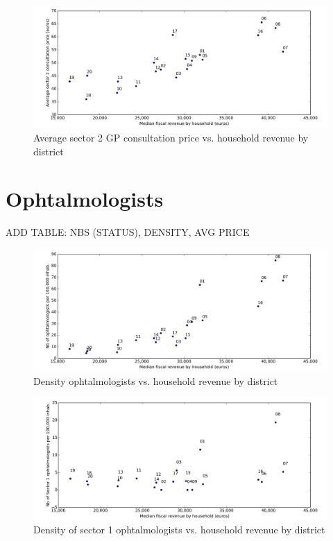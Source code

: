 \documentclass[11pt]{article}
\begin{document}
\begin{figure}[H]
    \caption{Average sector 2 GP consultation price vs. household revenue by district}
	\centering
		\includegraphics[width=16cm]{images/GP_Ardt_ConsultationS2VsRevenue.png}
\end{figure}

\section{Ophtalmologists}

ADD TABLE: NBS (STATUS), DENSITY, AVG PRICE

\begin{figure}[H]
    \caption{Density ophtalmologists vs. household revenue by district}
	\centering
		\includegraphics[width=16cm]{images/Ophtalmo_Ardt_DensityVsRevenue.png}
\end{figure}

\begin{figure}[H]
    \caption{Density of sector 1 ophtalmologists vs. household revenue by district}
	\centering
		\includegraphics[width=16cm]{images/Ophtalmo_Ardt_DensityS1VsRevenue.png}
\end{figure}
\end{document}
